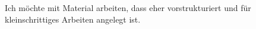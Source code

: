 Ich möchte mit Material arbeiten, dass eher vorstrukturiert und für kleinschrittiges Arbeiten angelegt ist.
